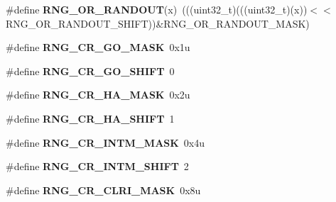 \begin{DoxyCompactItemize}
\item 
\#define {\bfseries R\+N\+G\+\_\+\+O\+R\+\_\+\+R\+A\+N\+D\+O\+UT}(x)~(((uint32\+\_\+t)(((uint32\+\_\+t)(x))$<$$<$R\+N\+G\+\_\+\+O\+R\+\_\+\+R\+A\+N\+D\+O\+U\+T\+\_\+\+S\+H\+I\+FT))\&R\+N\+G\+\_\+\+O\+R\+\_\+\+R\+A\+N\+D\+O\+U\+T\+\_\+\+M\+A\+SK)\hypertarget{group__RNG__Register__Masks_gadee84e83028dd2a869b62f046e20f795}{}\label{group__RNG__Register__Masks_gadee84e83028dd2a869b62f046e20f795}

\item 
\#define {\bfseries R\+N\+G\+\_\+\+C\+R\+\_\+\+G\+O\+\_\+\+M\+A\+SK}~0x1u\hypertarget{group__RNG__Register__Masks_ga2aebfd44952b9acb9854f17cbb241dc3}{}\label{group__RNG__Register__Masks_ga2aebfd44952b9acb9854f17cbb241dc3}

\item 
\#define {\bfseries R\+N\+G\+\_\+\+C\+R\+\_\+\+G\+O\+\_\+\+S\+H\+I\+FT}~0\hypertarget{group__RNG__Register__Masks_ga33164b67927c62a20a5cc0ebf24a6dec}{}\label{group__RNG__Register__Masks_ga33164b67927c62a20a5cc0ebf24a6dec}

\item 
\#define {\bfseries R\+N\+G\+\_\+\+C\+R\+\_\+\+H\+A\+\_\+\+M\+A\+SK}~0x2u\hypertarget{group__RNG__Register__Masks_ga771a9a36a3856ec15886952dd5881e67}{}\label{group__RNG__Register__Masks_ga771a9a36a3856ec15886952dd5881e67}

\item 
\#define {\bfseries R\+N\+G\+\_\+\+C\+R\+\_\+\+H\+A\+\_\+\+S\+H\+I\+FT}~1\hypertarget{group__RNG__Register__Masks_ga003221e3c2c56d155f0144d99b9daa28}{}\label{group__RNG__Register__Masks_ga003221e3c2c56d155f0144d99b9daa28}

\item 
\#define {\bfseries R\+N\+G\+\_\+\+C\+R\+\_\+\+I\+N\+T\+M\+\_\+\+M\+A\+SK}~0x4u\hypertarget{group__RNG__Register__Masks_gaeb6ea10a08f7c854d7a2d566afbc509a}{}\label{group__RNG__Register__Masks_gaeb6ea10a08f7c854d7a2d566afbc509a}

\item 
\#define {\bfseries R\+N\+G\+\_\+\+C\+R\+\_\+\+I\+N\+T\+M\+\_\+\+S\+H\+I\+FT}~2\hypertarget{group__RNG__Register__Masks_ga3e492e16a9a75e903cc108e526b51d7f}{}\label{group__RNG__Register__Masks_ga3e492e16a9a75e903cc108e526b51d7f}

\item 
\#define {\bfseries R\+N\+G\+\_\+\+C\+R\+\_\+\+C\+L\+R\+I\+\_\+\+M\+A\+SK}~0x8u\hypertarget{group__RNG__Register__Masks_gabe50fd44817cb9fbdf15fc9f832bfafa}{}\label{group__RNG__Register__Masks_gabe50fd44817cb9fbdf15fc9f832bfafa}


\end{DoxyCompactItemize}
